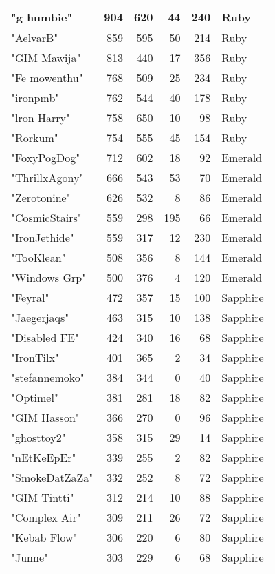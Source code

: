 \documentclass{article}
\begin{document}
\begin{table}[htbp]
\begin{tabular}{|l|r|r|r|r|l|}
"g humbie" & 904 & 620 & 44 & 240 & Ruby \\ \hline
"AelvarB" & 859 & 595 & 50 & 214 & Ruby \\ \hline
"GIM Mawija" & 813 & 440 & 17 & 356 & Ruby \\ \hline
"Fe mowenthu" & 768 & 509 & 25 & 234 & Ruby \\ \hline
"ironpmb" & 762 & 544 & 40 & 178 & Ruby \\ \hline
"lron Harry" & 758 & 650 & 10 & 98 & Ruby \\ \hline
"Rorkum" & 754 & 555 & 45 & 154 & Ruby \\ \hline
"FoxyPogDog" & 712 & 602 & 18 & 92 & Emerald \\ \hline
"ThrillxAgony" & 666 & 543 & 53 & 70 & Emerald \\ \hline
"Zerotonine" & 626 & 532 & 8 & 86 & Emerald \\ \hline
"CosmicStairs" & 559 & 298 & 195 & 66 & Emerald \\ \hline
"IronJethide" & 559 & 317 & 12 & 230 & Emerald \\ \hline
"TooKlean" & 508 & 356 & 8 & 144 & Emerald \\ \hline
"Windows Grp" & 500 & 376 & 4 & 120 & Emerald \\ \hline
"Feyral" & 472 & 357 & 15 & 100 & Sapphire \\ \hline
"Jaegerjaqs" & 463 & 315 & 10 & 138 & Sapphire \\ \hline
"Disabled FE" & 424 & 340 & 16 & 68 & Sapphire \\ \hline
"IronTilx" & 401 & 365 & 2 & 34 & Sapphire \\ \hline
"stefannemoko" & 384 & 344 & 0 & 40 & Sapphire \\ \hline
"Optimel" & 381 & 281 & 18 & 82 & Sapphire \\ \hline
"GIM Hasson" & 366 & 270 & 0 & 96 & Sapphire \\ \hline
"ghosttoy2" & 358 & 315 & 29 & 14 & Sapphire \\ \hline
"nEtKeEpEr" & 339 & 255 & 2 & 82 & Sapphire \\ \hline
"SmokeDatZaZa" & 332 & 252 & 8 & 72 & Sapphire \\ \hline
"GIM Tintti" & 312 & 214 & 10 & 88 & Sapphire \\ \hline
"Complex Air" & 309 & 211 & 26 & 72 & Sapphire \\ \hline
"Kebab Flow" & 306 & 220 & 6 & 80 & Sapphire \\ \hline
"Junne" & 303 & 229 & 6 & 68 & Sapphire \\ \hline

\end{tabular}
\end{table}
\end{document}
